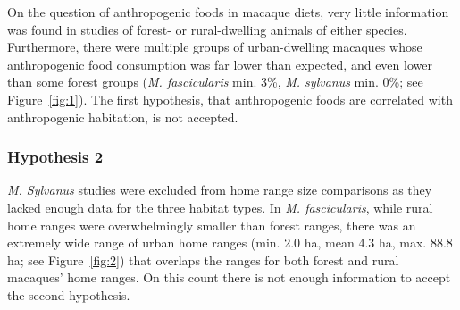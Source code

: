 \documentclass[american]{../../../coursework}
\begin{document}
On the question of anthropogenic foods in macaque diets, very little
information was found in studies of forest- or rural-dwelling animals of
either species. Furthermore, there were multiple groups of urban-dwelling
macaques whose anthropogenic food consumption was far lower than expected, and
even lower than some forest groups (\textit{M. fascicularis} min. 3\%,
\textit{M. sylvanus} min. 0\%; see Figure~\ref{fig:1}). The first hypothesis,
that anthropogenic foods are correlated with anthropogenic habitation, is not
accepted.

\subsubsection{Hypothesis 2}

\textit{M. Sylvanus} studies were excluded from home range size comparisons as
they lacked enough data for the three habitat types. In
\textit{M. fascicularis}, while rural home ranges were overwhelmingly smaller
than forest ranges, there was an extremely wide range of urban home ranges
(min. 2.0 ha, mean 4.3 ha, max. 88.8 ha; see Figure~\ref{fig:2}) that overlaps
the ranges for both forest and rural macaques' home ranges. On this count
there is not enough information to accept the second hypothesis.
\end{document}
